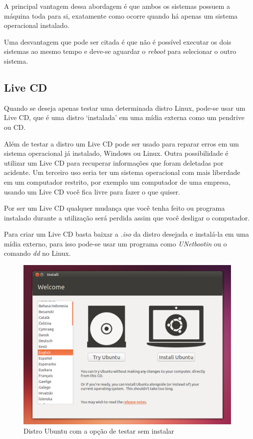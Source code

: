 \documentclass{handout_utfpr}
\begin{document}
A principal vantagem dessa abordagem é que ambos os sistemas possuem a máquina toda para si, exatamente como ocorre quando há apenas um sistema operacional instalado.

Uma desvantagem que pode ser citada é que não é possível executar os dois sistemas ao mesmo tempo e deve-se aguardar o \textit{reboot} para selecionar o outro sistema.


\subsection{Live CD}

Quando se deseja apenas testar uma determinada distro Linux, pode-se usar um Live CD, que é uma distro `instalada' em uma mídia externa como um pendrive ou CD. 

Além de testar a distro um Live CD pode ser usado para reparar erros em um sistema operacional já instalado, Windows ou Linux. Outra possibilidade é utilizar um Live CD para recuperar informações que foram deletadas por acidente. Um terceiro uso seria ter um sistema operacional com mais liberdade em um computador restrito, por exemplo um computador de uma empresa, usando um Live CD você fica livre para fazer o que quiser.

Por ser um Live CD qualquer mudança que você tenha feito ou programa instalado durante a utilização será perdida assim que você desligar o computador.

Para criar um Live CD basta baixar a \emph{.iso} da distro desejada e instalá-la em uma mídia externo, para isso pode-se usar um programa como \emph{UNetbootin} ou o comando \emph{dd} no Linux.

\begin{figure}[!h]
  \centering
  \includegraphics[scale=.5]{imagens/ubuntu-livecd.png}
  \caption{Distro Ubuntu com a opção de testar sem instalar}
  \label{fig:ubuntu-live}
\end{figure}
\end{document}
